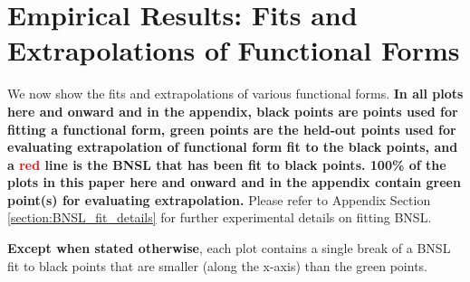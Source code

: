 \documentclass{article} %
\begin{document}




%
\section{Empirical Results: Fits and Extrapolations of Functional Forms}
\vspace{-3.85mm}
\label{section:functional_form_fits}

We now show the fits and extrapolations of various functional forms. \textbf{In all plots here and onward and in the appendix, black points are points used for fitting a functional form, \textcolor{Green3}{green} points are the held-out points used for evaluating extrapolation of functional form fit to the black points, and a \textcolor{red}{red} line is the BNSL that has been fit to black points. 100\% of the plots in this paper here and onward and in the appendix contain \textcolor{Green3}{green} point(s) for evaluating extrapolation.} Please refer to Appendix Section \ref{section:BNSL_fit_details} for further experimental details on fitting BNSL. 

\vspace{-1.6mm}

\textbf{Except when stated otherwise}, each plot contains a single break of a BNSL fit to black points that are smaller (along the x-axis) than the green points.

\vspace{-1.6mm}

\end{document}
